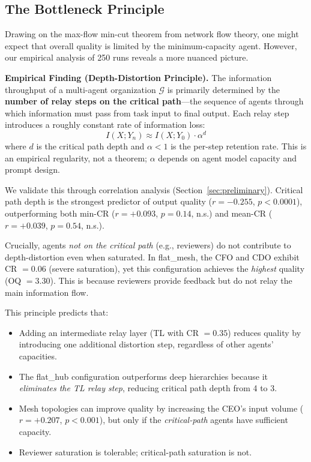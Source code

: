 \documentclass[conference]{IEEEtran}
\begin{document}
\subsection{The Bottleneck Principle}
\label{subsec:bottleneck}

Drawing on the max-flow min-cut theorem from network flow theory, one might expect that overall quality is limited by the minimum-capacity agent.
However, our empirical analysis of 250 runs reveals a more nuanced picture.

\noindent\textbf{Empirical Finding (Depth-Distortion Principle).}
The information throughput of a multi-agent organization $\mathcal{G}$ is primarily determined by the \textbf{number of relay steps on the critical path}---the sequence of agents through which information must pass from task input to final output.
Each relay step introduces a roughly constant rate of information loss:
\begin{equation}
    I(X; Y_n) \approx I(X; Y_0) \cdot \alpha^d
    \label{eq:depth_distortion}
\end{equation}
where $d$ is the critical path depth and $\alpha < 1$ is the per-step retention rate.
This is an empirical regularity, not a theorem; $\alpha$ depends on agent model capacity and prompt design.

We validate this through correlation analysis (Section~\ref{sec:preliminary}).
Critical path depth is the strongest predictor of output quality ($r = -0.255$, $p < 0.0001$), outperforming both min-CR ($r = +0.093$, $p = 0.14$, n.s.) and mean-CR ($r = +0.039$, $p = 0.54$, n.s.).

Crucially, agents \emph{not on the critical path} (e.g., reviewers) do not contribute to depth-distortion even when saturated.
In flat\_mesh, the CFO and CDO exhibit CR $= 0.06$ (severe saturation), yet this configuration achieves the \emph{highest} quality (OQ $= 3.30$).
This is because reviewers provide feedback but do not relay the main information flow.

This principle predicts that:
\begin{itemize}
    \item Adding an intermediate relay layer (TL with CR $= 0.35$) reduces quality by introducing one additional distortion step, regardless of other agents' capacities.
    \item The flat\_hub configuration outperforms deep hierarchies because it \emph{eliminates the TL relay step}, reducing critical path depth from 4 to 3.
    \item Mesh topologies can improve quality by increasing the CEO's input volume ($r = +0.207$, $p < 0.001$), but only if the \emph{critical-path} agents have sufficient capacity.
    \item Reviewer saturation is tolerable; critical-path saturation is not.
\end{itemize}
\end{document}
